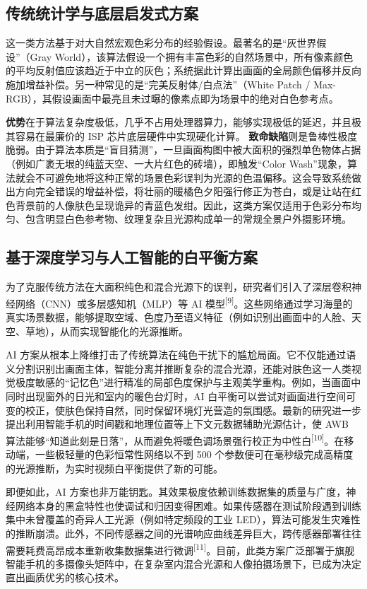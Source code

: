 \documentclass[12pt, a4paper]{ctexart}
\newcommand{\scite}[1]{\textsuperscript{[#1]}}
\begin{document}
\subsection{传统统计学与底层启发式方案}

这一类方法基于对大自然宏观色彩分布的经验假设。最著名的是“灰世界假设”（Gray World），该算法假设一个拥有丰富色彩的自然场景中，所有像素颜色的平均反射值应该趋近于中立的灰色；系统据此计算出画面的全局颜色偏移并反向施加增益补偿。另一种常见的是“完美反射体/白点法”（White Patch / Max-RGB），其假设画面中最亮且未过曝的像素点即为场景中的绝对白色参考点。

\textbf{优势}在于算法复杂度极低，几乎不占用处理器算力，能够实现极低的延迟，并且极其容易在最廉价的 ISP 芯片底层硬件中实现硬化计算。
\textbf{致命缺陷}则是鲁棒性极度脆弱。由于算法本质是“盲目猜测”，一旦画面构图中被大面积的强烈单色物体占据（例如广袤无垠的纯蓝天空、一大片红色的砖墙），即触发“Color Wash”现象，算法就会不可避免地将这种正常的场景色彩误判为光源的色温偏移。这会导致系统做出方向完全错误的增益补偿，将壮丽的暖橘色夕阳强行修正为苍白，或是让站在红色背景前的人像肤色呈现诡异的青蓝色发绀。因此，这类方案仅适用于色彩分布均匀、包含明显白色参考物、纹理复杂且光源构成单一的常规全景户外摄影环境。

\subsection{基于深度学习与人工智能的白平衡方案}

为了克服传统方法在大面积纯色和混合光源下的误判，研究者们引入了深层卷积神经网络（CNN）或多层感知机（MLP）等 AI 模型\scite{9}。这些网络通过学习海量的真实场景数据，能够提取空域、色度乃至语义特征（例如识别出画面中的人脸、天空、草地），从而实现智能化的光源推断。

AI 方案从根本上降维打击了传统算法在纯色干扰下的尴尬局面。它不仅能通过语义分割识别出画面主体，智能分离并推断复杂的混合光源，还能对肤色这一人类视觉极度敏感的“记忆色”进行精准的局部色度保护与主观美学重构。例如，当画面中同时出现窗外的日光和室内的暖色台灯时，AI 白平衡可以尝试对画面进行空间可变的校正，使肤色保持自然，同时保留环境灯光营造的氛围感。最新的研究进一步提出利用智能手机的时间戳和地理位置等上下文元数据辅助光源估计，使 AWB 算法能够“知道此刻是日落”，从而避免将暖色调场景强行校正为中性白\scite{10}。在移动端，一些极轻量的色彩恒常性网络以不到 500 个参数便可在毫秒级完成高精度的光源推断，为实时视频白平衡提供了新的可能。

即便如此，AI 方案也非万能钥匙。其效果极度依赖训练数据集的质量与广度，神经网络本身的黑盒特性也使调试和归因变得困难。如果传感器在测试阶段遇到训练集中未曾覆盖的奇异人工光源（例如特定频段的工业 LED），算法可能发生灾难性的推断崩溃。此外，不同传感器之间的光谱响应曲线差异巨大，跨传感器部署往往需要耗费高昂成本重新收集数据集进行微调\scite{11}。目前，此类方案广泛部署于旗舰智能手机的多摄像头矩阵中，在复杂室内混合光源和人像拍摄场景下，已成为决定直出画质优劣的核心技术。
\end{document}
